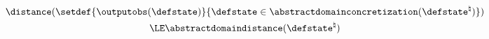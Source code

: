 \begin{gather*}
\distance(\setdef{\outputobs(\defstate)}{\defstate\in\abstractdomainconcretization(\defstate^\natural)}) \\
\LE \abstractdomaindistance(\defstate^\natural)
\end{gather*}
